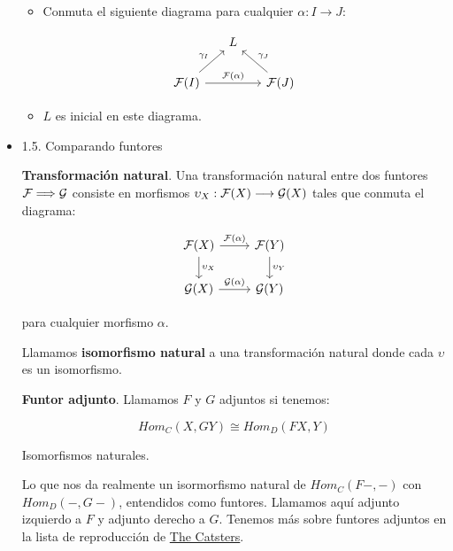 \documentclass[11pt]{article}
\begin{document}
\begin{itemize}
\begin{definition}
\begin{itemize}
\item Conmuta el siguiente diagrama para cualquier $\alpha : I \longrightarrow J$:
\end{itemize}

\[ \begin{tikzcd}[column sep=1.5em]
  & L  \\
 {\cal F}(I) \arrow{ur}{\gamma_I} \arrow{rr}{{\cal F}(\alpha)} && {\cal F}(J) \arrow{ul}[swap]{\gamma_J}
 \end{tikzcd} \]

\begin{itemize}
\item $L$ es inicial en este diagrama.
\end{itemize}
\end{definition}

\item 1.5. Comparando funtores
\label{sec-4-4-1-4}
\begin{definition}
\textbf{Transformación natural}. Una transformación natural entre dos funtores ${\cal F} \Longrightarrow {\cal G}$ 
consiste en morfismos $\upsilon_X : {\cal F}(X) \longrightarrow {\cal G}(X)$ tales que conmuta el diagrama:

\[ \begin{tikzcd}
 {\cal F}(X) \arrow{r}{{\cal F}(\alpha)} \arrow{d}{\upsilon_X} & {\cal F}(Y) \arrow{d}{\upsilon_Y} \\
 {\cal G}(X) \arrow{r}{{\cal G}(\alpha)} & {\cal G}(Y)
 \end{tikzcd}
 \]

para cualquier morfismo $\alpha$.

Llamamos \textbf{isomorfismo natural} a una transformación natural donde cada $\upsilon$
es un isomorfismo.
\end{definition}

\begin{definition}
\textbf{Funtor adjunto}. Llamamos ${F}$ y ${G}$ adjuntos si tenemos:

\[ Hom_C(X,GY) \cong Hom_D(FX,Y) \]

Isomorfismos naturales.
\end{definition}

Lo que nos da realmente un isormorfismo natural de $Hom_C(F-,-)$ con $Hom_D(-,G-)$,
entendidos como funtores. Llamamos aquí adjunto izquierdo a $F$ y adjunto derecho a $G$.
Tenemos más sobre funtores adjuntos en la lista de reproducción de \href{https://www.youtube.com/playlist?list=PL54B49729E5102248}{The Catsters}.


\end{itemize}
\end{document}
